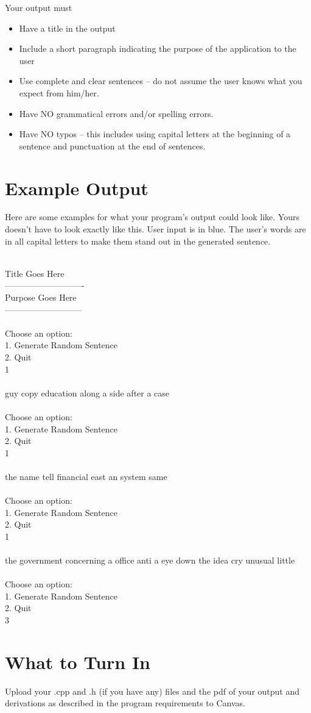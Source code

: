 \documentclass[11pt]{article}
\begin{document}
Your output must
\begin{itemize}
\item
  Have a title in the output
\item 
  Include a short paragraph indicating the purpose of the
  application to the user
\item 
  Use complete and clear sentences -- do not assume the user knows
  what you expect from him/her.
\item 
  Have NO grammatical errors and/or spelling errors.
\item 
  Have NO typos -- this includes using capital letters at the
  beginning of a sentence and punctuation at the end of sentences.
\end{itemize}

\newpage
\section*{Example Output}
Here are some examples for what your program's output could look
like. Yours doesn't have to look exactly like this. User input is in
{\color{blue} blue}.  The user's words are in all capital letters to
make them stand out in the generated sentence.

\ttfamily
\hfill\\
Title Goes Here\\
----------------------------\\
Purpose Goes Here\\
---------------------------\\
\\
Choose an option: \\
1. Generate Random Sentence\\
2. Quit\\
{\color{blue} 1}\\
\\
guy copy education along a side after a case\\
\\
Choose an option: \\
1. Generate Random Sentence\\
2. Quit\\
{\color{blue} 1}\\
\\
the name tell financial east an system same\\
\\
Choose an option: \\
1. Generate Random Sentence\\
2. Quit\\
{\color{blue} 1}\\
\\
the government concerning a office anti a eye down the idea cry unusual little\\
\\
Choose an option: \\
1. Generate Random Sentence\\
2. Quit\\
{\color{blue} 3}\\
\rmfamily

\section*{What to Turn In}
Upload your .cpp and .h (if you have any) files and the pdf of your
output and derivations as described in the program requirements to Canvas.
\end{document}
